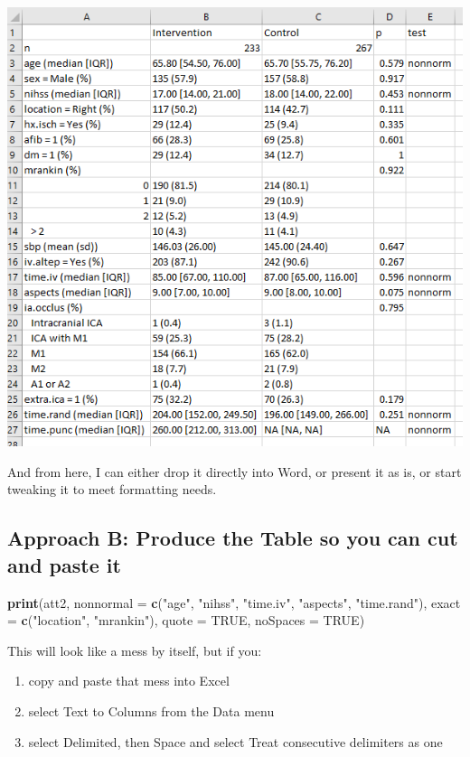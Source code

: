 \documentclass[]{book}
\newenvironment{Shaded}{\begin{snugshade}}{\end{snugshade}}
\newcommand{\KeywordTok}[1]{\textcolor[rgb]{0.13,0.29,0.53}{\textbf{#1}}}
\newcommand{\DataTypeTok}[1]{\textcolor[rgb]{0.13,0.29,0.53}{#1}}
\newcommand{\StringTok}[1]{\textcolor[rgb]{0.31,0.60,0.02}{#1}}
\newcommand{\OtherTok}[1]{\textcolor[rgb]{0.56,0.35,0.01}{#1}}
\newcommand{\NormalTok}[1]{#1}
\providecommand{\tightlist}{%
  \setlength{\itemsep}{0pt}\setlength{\parskip}{0pt}}
\theoremstyle{definition}
\theoremstyle{definition}
\theoremstyle{definition}
\theoremstyle{remark}
\begin{document}
\includegraphics[width=0.9\linewidth]{images/fs-table1inExcel}

And from here, I can either drop it directly into Word, or present it as
is, or start tweaking it to meet formatting needs.

\subsection{Approach B: Produce the Table so you can cut and paste
it}\label{approach-b-produce-the-table-so-you-can-cut-and-paste-it}

\begin{Shaded}
\begin{Highlighting}[]
\KeywordTok{print}\NormalTok{(att2, }
      \DataTypeTok{nonnormal =} \KeywordTok{c}\NormalTok{(}\StringTok{"age"}\NormalTok{, }\StringTok{"nihss"}\NormalTok{, }\StringTok{"time.iv"}\NormalTok{, }\StringTok{"aspects"}\NormalTok{, }\StringTok{"time.rand"}\NormalTok{),}
      \DataTypeTok{exact =} \KeywordTok{c}\NormalTok{(}\StringTok{"location"}\NormalTok{, }\StringTok{"mrankin"}\NormalTok{),}
      \DataTypeTok{quote =} \OtherTok{TRUE}\NormalTok{, }\DataTypeTok{noSpaces =} \OtherTok{TRUE}\NormalTok{)}
\end{Highlighting}
\end{Shaded}

This will look like a mess by itself, but if you:

\begin{enumerate}
\def\labelenumi{\arabic{enumi}.}
\tightlist
\item
  copy and paste that mess into Excel
\item
  select Text to Columns from the Data menu
\item
  select Delimited, then Space and select Treat consecutive delimiters
  as one
\end{enumerate}
\end{document}
